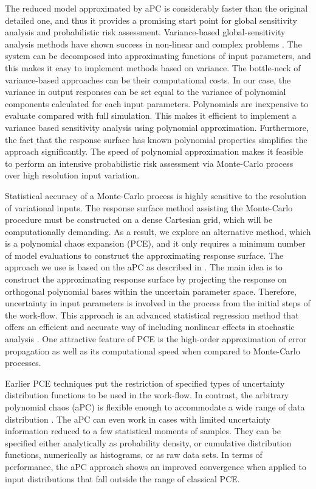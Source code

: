 The reduced model approximated by aPC is considerably faster than the original
detailed one, and thus it  provides a promising start point for global
sensitivity analysis and probabilistic risk assessment. Variance-based global-sensitivity analysis methods have shown success in non-linear and complex problems \cite{reuter2008global}.
The system can be decomposed into approximating functions of input parameters, and this makes it easy to implement methods based on variance. The bottle-neck of variance-based approaches can be their computational costs. In our case, the variance in output responses can be set equal to the variance of polynomial components calculated for each input parameters. Polynomials are inexpensive to evaluate compared with full simulation. This makes it efficient to implement a variance based sensitivity analysis using polynomial approximation. Furthermore, the fact that the response surface has known polynomial properties simplifies the approach significantly. The speed of polynomial approximation makes it feasible to perform an
intensive probabilistic risk assessment via Monte-Carlo process over high resolution input variation.

Statistical accuracy of a Monte-Carlo process is highly sensitive to the
resolution of variational inputs. The response surface method assisting the
Monte-Carlo procedure must be constructed on a dense Cartesian grid, which will
be computationally demanding. As a result, we explore an alternative method, which is a polynomial chaos expansion (PCE), and it only
requires a minimum number of model evaluations to construct the approximating response surface. The approach we use is based on the aPC as described in \cite{oladyshkin2011concept}. The main idea is to construct the approximating response surface by projecting the response on orthogonal polynomial bases within the uncertain parameter space. Therefore, uncertainty in input parameters is involved in the process from the initial steps of the work-flow. This approach is an advanced statistical regression method that offers an efficient and accurate way of including nonlinear effects in stochastic analysis \cite{Zhang_Lu_2004_JCP,foo_pcm_JCP2010, 
Fajraoui_al_2011_WRR}. One attractive
feature of PCE is the high-order approximation of error propagation as well as its computational speed \cite{oladyshkinintegrative} when compared to Monte-Carlo processes.

Earlier PCE techniques put the restriction of specified types of uncertainty
distribution functions to be used in the work-flow. In contrast, the arbitrary polynomial chaos (aPC) is flexible enough to accommodate a wide range of data
distribution \cite{oladyshkin2011concept}. The aPC can even work in cases with
limited uncertainty information reduced to a few statistical moments of samples.
They can be specified either analytically as probability density, or cumulative
distribution functions, numerically as histograms, or as raw data sets. In
terms of performance, the aPC approach shows an improved convergence when applied to
input distributions that fall outside the range of classical PCE.

